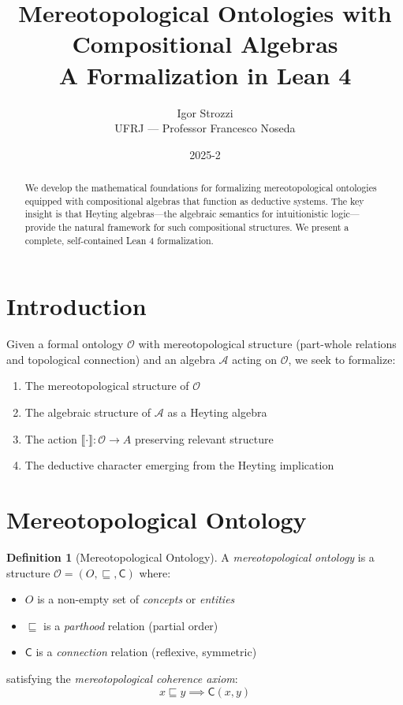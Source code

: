 \documentclass[12pt,a4paper]{article}
\title{\textbf{Mereotopological Ontologies with Compositional Algebras}\\[0.5em]
\large A Formalization in Lean 4}
\author{Igor Strozzi\\
\small UFRJ --- Professor Francesco Noseda}
\date{2025-2}
\theoremstyle{definition}
\newtheorem{definicao}{Definition}[section]
\theoremstyle{plain}
\theoremstyle{remark}
\newcommand{\sem}[1]{\llbracket #1 \rrbracket}
\begin{document}
\maketitle

\begin{abstract}
We develop the mathematical foundations for formalizing mereotopological ontologies equipped with compositional algebras that function as deductive systems. The key insight is that Heyting algebras---the algebraic semantics for intuitionistic logic---provide the natural framework for such compositional structures. We present a complete, self-contained Lean 4 formalization.
\end{abstract}

\tableofcontents
\newpage

\section{Introduction}

Given a formal ontology $\mathcal{O}$ with mereotopological structure (part-whole relations and topological connection) and an algebra $\mathcal{A}$ acting on $\mathcal{O}$, we seek to formalize:
\begin{enumerate}
    \item The mereotopological structure of $\mathcal{O}$
    \item The algebraic structure of $\mathcal{A}$ as a Heyting algebra
    \item The action $\sem{\cdot} : \mathcal{O} \to A$ preserving relevant structure
    \item The deductive character emerging from the Heyting implication
\end{enumerate}

\section{Mereotopological Ontology}

\begin{definicao}[Mereotopological Ontology]
A \emph{mereotopological ontology} is a structure $\mathcal{O} = (O, \sqsubseteq, \mathsf{C})$ where:
\begin{itemize}
    \item $O$ is a non-empty set of \emph{concepts} or \emph{entities}
    \item $\sqsubseteq$ is a \emph{parthood} relation (partial order)
    \item $\mathsf{C}$ is a \emph{connection} relation (reflexive, symmetric)
\end{itemize}
satisfying the \emph{mereotopological coherence axiom}:
$$
x \sqsubseteq y \implies \mathsf{C}(x, y)
$$
\end{definicao}
\end{document}
